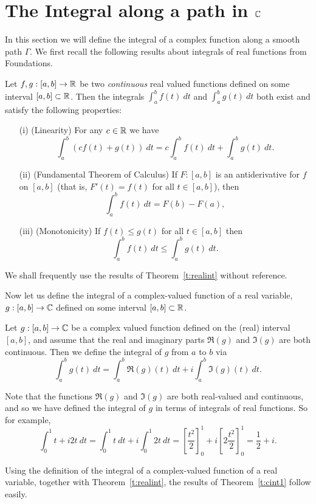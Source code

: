 \section{The Integral along a path in $\mathbb{C}$}
In this section we will define the integral of a complex function along a smooth path $\Gamma$.  We first recall the following results about integrals of real functions from Foundations.
\begin{theorem}
\label{t:realint}
Let $f,g:[a,b] \to \mathbb{R}$ be two \emph{continuous} real valued functions defined on some interval $[a,b] \subset \mathbb{R}$.  Then the integrals $\int_a^b f(t)\ dt$ and $\int_a^b g(t)\ dt$ both exist and satisfy the following properties:
\begin{enumerate}
\item[(i)] (Linearity) For any $c \in \mathbb{R}$ we have
\[
\int_a^b \left( cf(t) +  g(t) \right)\ dt = c\int_a^b f(t)\ dt +  \int_a^b g(t)\ dt.
\]
\item[(ii)] (Fundamental Theorem of Calculus) If $F:[a,b]$ is an antiderivative for $f$ on $[a,b]$ (that is, $F'(t) = f(t)$ for all $t \in [a,b]$), then 
\[
\int_a^b f(t)\ dt = F(b) - F(a),
\]
\item[(iii)] (Monotonicity) If $f(t) \leq g(t)$ for all $t \in [a,b]$ then
\[
\int_a^b f(t)\ dt \leq \int_a^b g(t)\ dt.
\]
\end{enumerate}
\end{theorem}
We shall frequently use the results of Theorem~\ref{t:realint} without reference.

Now let us define the integral of a complex-valued function of a real variable, $g:[a,b] \to \mathbb{C}$ defined on some interval $[a,b] \subset \mathbb{R}$.

\begin{definition}
\label{d:realint}
Let $g:[a,b] \to \mathbb{C}$ be a complex valued function defined on the (real) interval $[a,b]$, and assume that the real and imaginary parts $\Re (g)$ and $\Im (g)$ are both continuous.  Then we define the integral of $g$ from $a$ to $b$ via
\[
\int_a^b g(t)\ dt = \int_a^b \Re (g) (t)\ dt + i \int_a^b \Im (g) (t)\ dt.
\]
\end{definition}
Note that the functions $\Re (g)$ and $\Im (g)$ are both real-valued and continuous, and so we have defined the integral of $g$ in terms of integrals of real functions.  So for example,
\[
\int_0^1 t+i2t\ dt = \int_0^1 t\ dt +i \int_0^1 2t\ dt = \left[ \frac{t^2}{2} \right]_0^1 + i \left[ 2 \frac{t^2}{2} \right]_0^1
= \frac{1}{2}+i.\]


Using the definition of the integral of a complex-valued function of a real variable, together with Theorem~\ref{t:realint}, the results of Theorem~\ref{t:cint1} follow easily.

